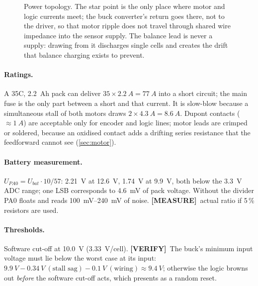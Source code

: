 \documentclass[11pt,a4paper]{article}
\newcommand{\mk}[2]{\textsf{\scriptsize\bfseries\colorbox{#1bg}{\color{#1}[#2]}}}
\newcommand{\MEASURE}{\mk{warn}{MEASURE}}
\newcommand{\VERIFY}{\mk{cold}{VERIFY}}
\begin{document}
\begin{figure}[htbp]
\caption{Power topology. The star point is the only place where motor and logic
currents meet; the buck converter's return goes there, not to the driver, so that
motor ripple does not travel through shared wire impedance into the sensor
supply. The balance lead is never a supply: drawing from it discharges single
cells and creates the drift that balance charging exists to prevent.}
\label{fig:power}
\end{figure}

\paragraph{Ratings.} A 35C, \qty{2.2}{Ah} pack can deliver
$35\times\qty{2.2}{A}=\qty{77}{A}$ into a short circuit; the main fuse is the
only part between a short and that current. It is slow-blow because a
simultaneous stall of both motors draws $2\times\qty{4.3}{A}=\qty{8.6}{A}$.
Dupont contacts ($\approx\qty{1}{A}$) are acceptable only for encoder and logic
lines; motor leads are crimped or soldered, because an oxidised contact adds a
drifting series resistance that the feedforward cannot see (\cref{sec:motor}).

\paragraph{Battery measurement.} $U_{PA0}=U_{bat}\cdot 10/57$: \qty{2.21}{V} at
\qty{12.6}{V}, \qty{1.74}{V} at \qty{9.9}{V}, both below the \qty{3.3}{V} ADC range;
one LSB corresponds to \qty{4.6}{mV} of pack voltage. Without the divider PA0
floats and reads \qtyrange{100}{240}{mV} of noise. \MEASURE\ actual ratio if
5\,\% resistors are used.

\paragraph{Thresholds.} Software cut-off at \qty{10.0}{V} (\qty{3.33}{V/cell}).
\VERIFY\ The buck's minimum input voltage must lie below the worst case at its
input: $\qty{9.9}{V}-\qty{0.34}{V}\ (\text{stall sag})-\qty{0.1}{V}\ (\text{wiring})
\approx\qty{9.4}{V}$; otherwise the logic browns out \emph{before} the software
cut-off acts, which presents as a random reset.
\end{document}
